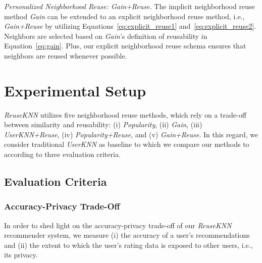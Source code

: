 \documentclass[manuscript,review,anonymous]{acmart}
\newcommand{\dk}[1]{
        \textcolor{blue}{DK: #1}}
\newcommand{\pmu}[1]{
        \textcolor{orange}{PM: #1}}
\begin{document}
\vspace{2mm} \noindent \emph{Personalized Neighborhood Reuse: Gain+Reuse.} The implicit neighborhood reuse method \emph{Gain} can be extended to an explicit neighborhood reuse method, i.e., \emph{Gain+Reuse} by utilizing Equations~\ref{eq:explicit_reuse1} and~\ref{eq:explicit_reuse2}.
Neighbors are selected based on \emph{Gain}'s definition of reusability in Equation~\ref{eq:gain}.
Plus, our explicit neighborhood reuse schema ensures that neighbors are reused whenever possible.

\section{Experimental Setup}
\emph{ReuseKNN} utilizes five neighborhood reuse methods, which rely on a trade-off between similarity and reusability: %
(i) \emph{Popularity}, (ii) \emph{Gain}, (iii) \emph{UserKNN+Reuse}, (iv) \emph{Popularity+Reuse}, and (v) \emph{Gain+Reuse}.
In this regard, we consider traditional \emph{UserKNN} as baseline to which we compare our methods to according to three evaluation criteria.

\subsection{Evaluation Criteria}
\subsubsection{Accuracy-Privacy Trade-Off}
In order to shed light on the accuracy-privacy trade-off of our \emph{ReuseKNN} recommender system, we measure (i) the accuracy of a user's recommendations and (ii) the extent to which the user's rating data is exposed to other users, i.e., its privacy.
\end{document}
